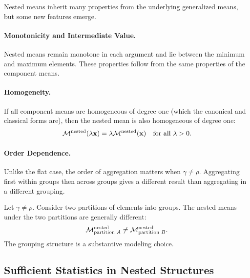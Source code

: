 Nested means inherit many properties from the underlying generalized means, but some new features emerge.

\paragraph{Monotonicity and Intermediate Value.}
Nested means remain monotone in each argument and lie between the minimum and maximum elements. These properties follow from the same properties of the component means.

\paragraph{Homogeneity.}
If all component means are homogeneous of degree one (which the canonical and classical forms are), then the nested mean is also homogeneous of degree one:
\begin{equation}
\mathcal{M}^{\text{nested}}(\lambda \mathbf{x}) = \lambda \mathcal{M}^{\text{nested}}(\mathbf{x}) \quad \text{for all } \lambda > 0.
\label{eq:nested-homogeneity}
\end{equation}

\paragraph{Order Dependence.}
Unlike the flat case, the order of aggregation matters when $\gamma \neq \rho$. Aggregating first within groups then across groups gives a different result than aggregating in a different grouping.

\begin{proposition}
\label{prop:non-commutativity}
Let $\gamma \neq \rho$. Consider two partitions of elements into groups. The nested means under the two partitions are generally different:
\begin{equation}
\mathcal{M}^{\text{nested}}_{\text{partition } A} \neq \mathcal{M}^{\text{nested}}_{\text{partition } B}.
\end{equation}
The grouping structure is a substantive modeling choice.
\end{proposition}

\subsection{Sufficient Statistics in Nested Structures}
\label{subsec:sufficient-nested}

